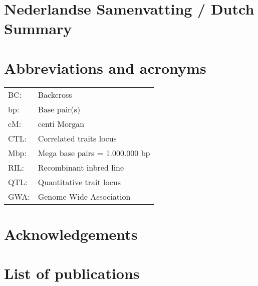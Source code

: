 \documentclass[8pt, twoside, a5paper]{report}
\begin{document}
\section*{Nederlandse Samenvatting / Dutch Summary}
\lipsum[1]

\section*{Abbreviations and acronyms}
\begin{tabular}{ l l }
BC:          & Backcross \\
bp:          & Base pair(s) \\
cM:          & centi Morgan \\
CTL:         & Correlated traits locus \\
Mbp:         & Mega base pairs = 1.000.000 bp \\
RIL:         & Recombinant inbred line \\
QTL:         & Quantitative trait locus \\
GWA:         & Genome Wide Association \\
\end{tabular}

\newpage

\section*{Acknowledgements}
\lipsum[1]

\newpage

\section*{List of publications}
\end{document}

